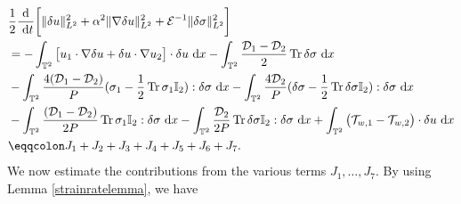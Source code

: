 \documentclass[12pt,a4paper]{article}
\theoremstyle{definition}
\theoremstyle{remark}
\numberwithin{equation}{section}
\newcommand{\dx}{\ {\rm d} {x}}
\newcommand{\dt}{\ {\rm d} t }
\DeclareMathOperator{\Tr}{Tr}
\begin{document}
\begin{align*}
&\frac{1}{2} \frac{\rm d}{\dt} \bigg[ \lVert \delta u \rVert_{L^2}^2 + \alpha^2 \lVert \nabla \delta u \rVert_{L^2}^2 + \mathcal{E}^{-1} \lVert \delta \sigma \rVert_{L^2}^2 \bigg] \\
&= - \int_{\mathbb{T}^2} \big[ u_1 \cdot \nabla \delta u + \delta u \cdot \nabla u_2 \big] \cdot \delta u \dx - \int_{\mathbb{T}^2} \frac{\mathcal{D}_1 - \mathcal{D}_2}{2} \Tr \delta \sigma \dx \\
&- \int_{\mathbb{T}^2} \frac{4 (\mathcal{D}_1 - \mathcal{D}_2)}{P}(\sigma_1 - \frac{1}{2} \Tr \sigma_1 \mathbb I_2) : \delta \sigma \dx - \int_{\mathbb{T}^2} \frac{4 \mathcal D_2}{P}(\delta \sigma - \frac{1}{2} \Tr \delta \sigma \mathbb I_2) : \delta \sigma \dx \\
&- \int_{\mathbb T^2} \frac{(\mathcal{D}_1 - \mathcal{D}_2)}{2P} \Tr \sigma_1 \mathbb I_2 : \delta \sigma \dx - \int_{\mathbb T^2} \frac{\mathcal D_2}{2P} \Tr \delta \sigma \mathbb I_2 : \delta \sigma \dx + \int_{\mathbb{T}^2} \big( \mathcal{T}_{w,1} - \mathcal{T}_{w,2} \big) \cdot \delta u \dx \\
&\eqqcolon J_1 + J_2 + J_3 + J_4 + J_5 + J_6 + J_7.
\end{align*}
We now estimate the contributions from the various terms $J_1, \ldots, J_7$. By using Lemma \ref{strainratelemma}, we have
\end{document}
